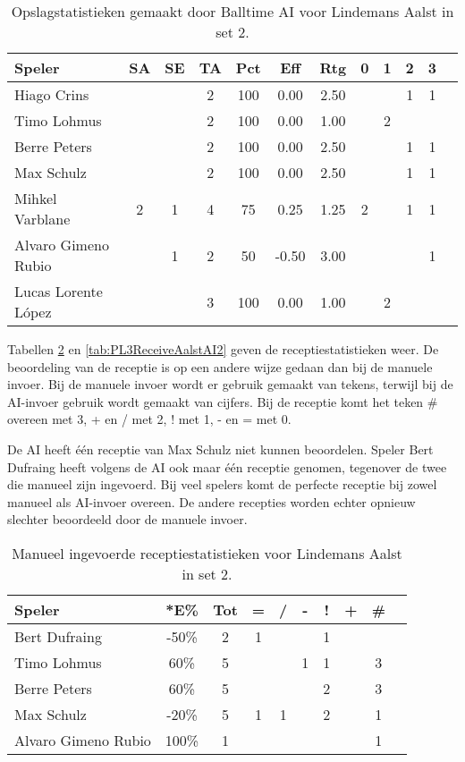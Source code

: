 \begin{table}[ht!]
  \centering
  \scriptsize
  \begin{tabular}{|l|c|c|c|c|c|c|c|c|c|c|c|} \hline
    \textbf{Speler} & SA & SE & TA & Pct & Eff & Rtg & 0 & 1 & 2 & 3  \\ \hline
    Hiago Crins &  &  & 2 & 100 & 0.00 & 2.50 &   &  & 1 & 1  \\
    Timo Lohmus &  &  & 2 & 100 & 0.00 & 1.00 &   & 2 &   &  \\
    Berre Peters &  &  & 2 & 100 & 0.00 & 2.50 &   &  & 1 & 1 \\
    Max Schulz &  &  & 2 & 100 & 0.00 & 2.50 &   &  & 1 & 1 \\
    Mihkel Varblane & 2 & 1 & 4 & 75 & 0.25 & 1.25 & 2 &   & 1 & 1 \\
    Alvaro Gimeno Rubio & & 1 & 2 & 50 & -0.50 & 3.00 &   &  & & 1 \\ 
    Lucas Lorente López &  &  & 3 & 100 & 0.00 & 1.00 &   & 2 &   & \\  \hline
  \end{tabular}
  \caption[Opslagstatistieken gemaakt door Balltime AI voor Lindemans Aalst in set 2]{\label{tab:PL3ServeAalstAI2}Opslagstatistieken gemaakt door Balltime AI voor Lindemans Aalst in set 2.}
\end{table}

Tabellen \ref{tab:PL3ReceiveAalstMan2} en \ref{tab:PL3ReceiveAalstAI2} geven de receptiestatistieken weer. De beoordeling van de receptie is op een andere wijze gedaan dan bij de manuele invoer. Bij de manuele invoer wordt er gebruik gemaakt van tekens, terwijl bij de AI-invoer gebruik wordt gemaakt van cijfers. Bij de receptie komt het teken \# overeen met 3, + en / met 2, ! met 1, - en = met 0.

De AI heeft één receptie van Max Schulz niet kunnen beoordelen. Speler Bert Dufraing heeft volgens de AI ook maar één receptie genomen, tegenover de twee die manueel zijn ingevoerd. Bij veel spelers komt de perfecte receptie bij zowel manueel als AI-invoer overeen. De andere recepties worden echter opnieuw slechter beoordeeld door de manuele invoer.

\begin{table}[ht!]
    \centering
    \scriptsize
    \begin{tabular}{|l|c|c|c|c|c|c|c|c|c|}
        \hline
        \textbf{Speler} & *E\% & Tot & = & / & - & ! & + & \# \\ \hline
        Bert Dufraing & -50\% & 2 & 1 &  & & 1 &  &  \\ 
        Timo Lohmus & 60\% & 5 &  &  & 1 & 1 & & 3 \\ 
        Berre Peters & 60\% & 5 &  &  &  & 2 & & 3 \\ 
        Max Schulz & -20\% & 5 & 1 & 1 & & 2 &  & 1 \\
        Alvaro Gimeno Rubio & 100\% & 1 &  &  &  & &  & 1 \\ \hline
    \end{tabular}
  \caption[Manueel ingevoerde receptiestatistieken voor Lindemans Aalst in set 2]{\label{tab:PL3ReceiveAalstMan2}Manueel ingevoerde receptiestatistieken voor Lindemans Aalst in set 2.}
\end{table}

